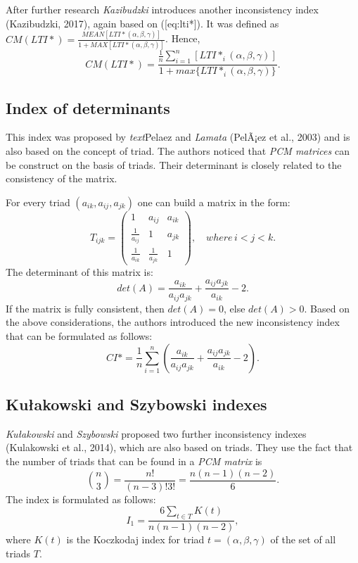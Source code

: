 After further research \textit{Kazibudzki} introduces another inconsistency index (Kazibudzki, 2017), again based on ([eq:lti*]). It was defined as $CM(LTI*)=\frac{MEAN[LTI*(\alpha,\beta,\gamma)]}{1+MAX[LTI*(\alpha,\beta,\gamma)]}$. Hence,
	\begin{equation} 
		CM(LTI*)=\frac{\frac{1}{n}\sum_{i=1}^{n}[LTI*_{i}(\alpha,\beta,\gamma)]}{1+max\{LTI*_{i}(\alpha,\beta,\gamma)\}}.
	 \end{equation}
 

\subsection{Index of determinants}

This index was proposed by \textit{text}{Pelaez} and \textit{Lamata} (PelÃ¡ez et al., 2003) and is also based on the concept of triad. The authors noticed that \textit{PCM  matrices} can be construct on the basis of triads. Their determinant is closely related to the consistency of the matrix.

For every triad $(a_{ik},a_{ij},a_{jk})$ one can build a matrix in the form: 
	\begin{equation} 
		T_{ijk}=\left(\begin{array}{ccc}
			1 & a_{ij} & a_{ik}\\
			\frac{1}{a_{ij}} & 1 & a_{jk}\\
			\frac{1}{a_{ik}} & \frac{1}{a_{jk}} & 1
		\end{array}\right),\,\,\,\,\,\,where\,i<j<k.
	\end{equation}
 The determinant of this matrix is:
	\begin{equation} 
		det(A)=\frac{a_{ik}}{a_{ij}a_{jk}}+\frac{a_{ij}a_{jk}}{a_{ik}}-2.
	 \end{equation}
 If the matrix is fully consistent, then $det(A)=0$, else $det(A)>0$. Based on the above considerations, the authors introduced the new inconsistency index that can be formulated as follows:
 	\begin{equation} 
		CI*=\frac{1}{n}\sum_{i=1}^{n}\left(\frac{a_{ik}}{a_{ij}a_{jk}}+\frac{a_{ij}a_{jk}}{a_{ik}}-2\right).
	 \end{equation}
 

\subsection{Kułakowski and Szybowski indexes}

\textit{Kułakowski} and \textit{Szybowski} proposed two further inconsistency indexes (Kulakowski et al., 2014), which are also based on triads. They use the fact that the number of triads that can be found in a \textit{PCM matrix} is 
	\begin{equation} 
		\binom{n}{3}=\frac{n!}{(n-3)!3!}=\frac{n(n-1)(n-2)}{6}.
	 \end{equation}
 The index is formulated as follows:
 	\begin{equation} 
		I_{1}=\frac{6\sum_{t\in T}K(t)}{n(n-1)(n-2)},
	 \end{equation}
 where $K(t)$ is the Koczkodaj index for triad $t=(\alpha,\beta,\gamma)$ of the set of all triads $T$. 

